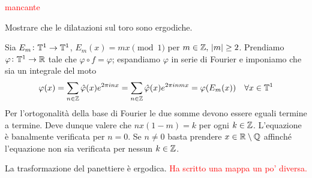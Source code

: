 \begin{example}
    \textcolor{red}{mancante}
\end{example}

\begin{exercise}
    Mostrare che le dilatazioni sul toro sono ergodiche.
\end{exercise}
\begin{solution}
    Sia $ E_m\colon\mathbb{T}^1\to\mathbb{T}^1 $, $ E_m(x) = mx\pmod{1} $ per $ m\in\mathbb{Z},\ \abs{m} \geq 2 $. Prendiamo $ \varphi\colon\mathbb{T}^1\to\mathbb{R} $ tale che $ \varphi\circ f = \varphi $; espandiamo $ \varphi $ in serie di Fourier e imponiamo che sia un integrale del moto
    \[ \varphi(x) = \sum_{n\in\mathbb{Z}} \hat\varphi(x) e^{2\pi i n x} = \sum_{n\in\mathbb{Z}} \hat\varphi(x) e^{2\pi i n m x} = \varphi(E_m(x)) \quad \forall x\in\mathbb{T}^1 \]
    Per l'ortogonalità della base di Fourier le due somme devono essere eguali termine a termine. Deve dunque valere che $ nx(1-m) = k $ per ogni $ k\in\mathbb{Z} $. L'equazione è banalmente verificata per $ n = 0 $. Se $ n\neq 0 $ basta prendere $ x\in\mathbb{R}\setminus\mathbb{Q} $ affinché l'equazione non sia verificata per nessun $ k\in\mathbb{Z} $.
\end{solution}

\begin{exercise}
    La trasformazione del panettiere è ergodica. \textcolor{red}{Ha scritto una mappa un po' diversa.}
\end{exercise}

